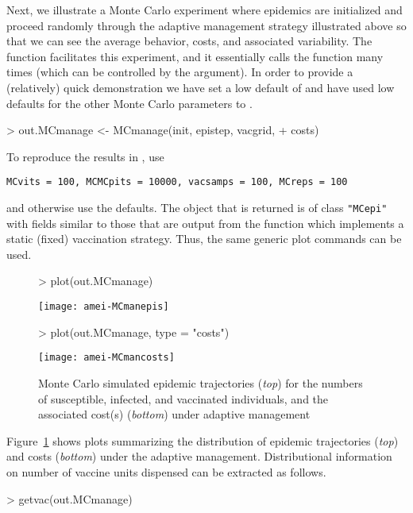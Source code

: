 \documentclass[shortnames,nojss]{jss}
\begin{document}
Next, we illustrate a Monte Carlo experiment where epidemics are
initialized and proceed randomly through the adaptive management
strategy illustrated above so that we can see the average behavior,
costs, and associated variability.  The function 
facilitates this experiment, and it essentially calls the 
 function many times (which can be controlled by the 
 argument).  In order to provide a (relatively) quick
demonstration we have set a low default of  and have
used low defaults for the other Monte Carlo parameters to 
.

\begin{Schunk}
\begin{Sinput}
> out.MCmanage <- MCmanage(init, epistep, vacgrid, 
+     costs)
\end{Sinput}
\end{Schunk}
To reproduce the results in \citet{merl09}, use 
\begin{verbatim}
MCvits = 100, MCMCpits = 10000, vacsamps = 100, MCreps = 100
\end{verbatim}
and otherwise use the defaults.  The object that is returned is of
class \verb!"MCepi"! with fields similar to those that are output from
the  function which implements a static (fixed) vaccination 
strategy.  Thus, the same generic plot commands can be used.
\begin{figure}[ht!]
\begin{Schunk}
\begin{Sinput}
> plot(out.MCmanage)
\end{Sinput}
\end{Schunk}
\centering
\texttt{[image: amei-MCmanepis]}
\begin{Schunk}
\begin{Sinput}
> plot(out.MCmanage, type = "costs")
\end{Sinput}
\end{Schunk}
\texttt{[image: amei-MCmancosts]}
\caption{Monte Carlo simulated epidemic trajectories ({\em top}) for the
  numbers of susceptible, infected, and vaccinated individuals, and
  the associated cost(s) ({\em bottom}) under adaptive management}
\label{f:epismanage}
\end{figure}
Figure~\ref{f:epismanage} shows plots summarizing the distribution of
epidemic trajectories ({\em top}) and costs ({\em bottom}) under the adaptive
management.  Distributional information on number of vaccine units
dispensed can be extracted as follows.
\begin{Schunk}
\begin{Sinput}
> getvac(out.MCmanage)
\end{Sinput}
\end{Schunk}
\end{document}
